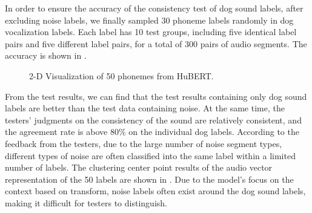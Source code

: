 In order to ensure the accuracy of the consistency test of dog sound labels, after excluding noise labels, we finally sampled 30 phoneme labels randomly in dog vocalization labels. Each label has 10 test groups, including five identical label pairs and five different label pairs, for a total of 300 pairs of audio segments. The accuracy is shown in .

\begin{figure}[th]
\caption{2-D Visualization of 50 phonemes from HuBERT.}
\label{fig:cluster}
\end{figure}

From the test results, we can find that the test results containing only dog sound labels are better than the test data containing noise. At the same time, the testers' judgments on the consistency of the sound are relatively consistent, and the agreement rate is above 80\% on the individual dog labels. According to the feedback from the testers, due to the large number of noise segment types, different types of noise are often classified into the same label within a limited number of labels. The clustering center point results of the audio vector representation of the 50 labels are shown in . Due to the model's focus on the context based on transform, noise labels often exist around the dog sound labels, making it difficult for testers to distinguish.


